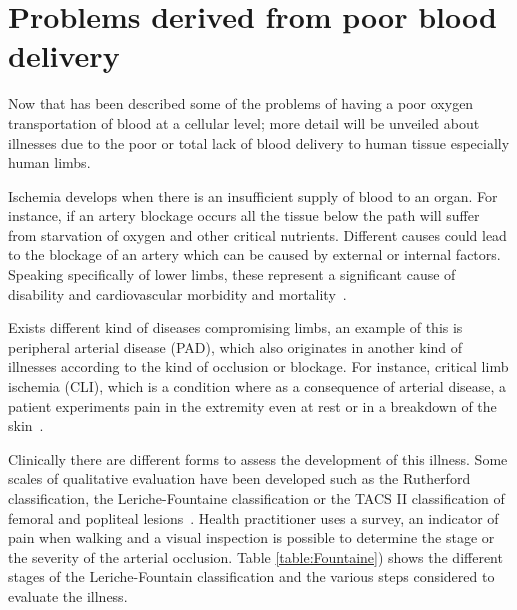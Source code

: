 \section{Problems derived from poor blood delivery} %
\label{section literature 2}
Now that has been described some of the problems of having a poor oxygen transportation of blood at a cellular level; more detail will be unveiled about illnesses due to the poor or total lack of blood delivery to human tissue especially human limbs. 

Ischemia develops when there is an insufficient supply of blood to an organ. For instance, if an artery blockage occurs all the tissue below the path will suffer from starvation of oxygen and other critical nutrients. Different causes could lead to the blockage of an artery which can be caused by external or internal factors. Speaking specifically of lower limbs, these represent a significant cause of disability and cardiovascular morbidity and mortality~\cite{novo1995patients}. 

Exists different kind of diseases compromising limbs, an example of this is peripheral arterial disease (PAD), which also originates in another kind of illnesses according to the kind of occlusion or blockage. For instance, critical limb ischemia (CLI), which is a condition where as a consequence of arterial disease, a patient experiments pain in the extremity even at rest or in a breakdown of the skin~\cite{novo2004critical}. 

Clinically there are different forms to assess the development of this illness. Some scales of qualitative evaluation have been developed such as the Rutherford classification, the Leriche-Fountaine classification or the TACS II classification of femoral and popliteal lesions~\cite{norgren2007inter}. Health practitioner uses a survey, an indicator of pain when walking and a visual inspection is possible to determine the stage or the severity of the arterial occlusion.  Table \ref{table:Fountaine}) shows the different stages of the Leriche-Fountain classification and the various steps considered to evaluate the illness.

